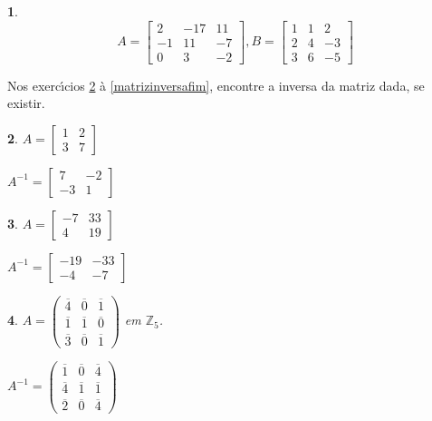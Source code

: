 \documentclass[12pt]{exam}
\newtheorem{exercicio}{}
\newcommand{\integer}{\mathbb{Z}}
\begin{document}
\begin{exercicio}\label{matrizfim}
\[
  A =\begin{bmatrix}
    2 & -17 & 11\\
    -1 & 11 & -7\\
    0 & 3 & -2
  \end{bmatrix}, B =\begin{bmatrix}
    1 & 1 & 2\\
    2 & 4 & -3\\
    3 & 6 & -5
  \end{bmatrix}
\]
\end{exercicio}

Nos exerc{\'\i}cios \ref{matrizinversainicio} \`a \ref{matrizinversafim}, encontre a inversa da matriz dada, se existir.

\begin{exercicio}\label{matrizinversainicio}
$A =\begin{bmatrix}
    1 & 2\\
    3 & 7
  \end{bmatrix}$
\begin{solucao}
  $A^{-1} =\begin{bmatrix}
    7 & -2\\
    -3 & 1
  \end{bmatrix}$
\end{solucao}
\end{exercicio}

\begin{exercicio}
$A =\begin{bmatrix}
    -7 & 33\\
    4 & 19
  \end{bmatrix}$
\begin{solucao}
  $A^{-1} =\begin{bmatrix}
    -19 & -33\\
    -4 & -7
  \end{bmatrix}$
\end{solucao}
\end{exercicio}

\begin{exercicio}
$A = \begin{pmatrix}
    \overline{4} & \overline{0} & \overline{1}\\
    \overline{1} & \overline{1} & \overline{0}\\
    \overline{3} & \overline{0} & \overline{1}
  \end{pmatrix}$ em $\integer_5$.
\begin{solucao}
  $A^{-1} = \begin{pmatrix}
    \overline{1} & \overline{0} & \overline{4}\\
    \overline{4} & \overline{1} & \overline{1}\\
    \overline{2} & \overline{0} & \overline{4}
  \end{pmatrix}$
\end{solucao}
\end{exercicio}
\end{document}
